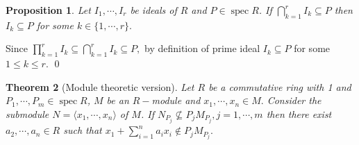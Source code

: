 \documentclass[11pt]{amsart}
\newtheorem{theorem}{Theorem}[section]
\newtheorem{prop}[theorem]{Proposition}
\newcommand{\gen}[1]{\langle#1\rangle}
\DeclareMathOperator{\spec}{\text{spec}}
\begin{document}
\begin{prop}

Let $I_1,\cdots, I_r$ be ideals of $R$ and $P\in\spec R$. If $\displaystyle\bigcap_{k=1}^r I_k\subseteq P$ then $I_k\subseteq P$ for some $k\in\{1,\cdots,r\}.$

\end{prop}

\proof Since $\displaystyle\prod_{k=1}^r I_k\subseteq \displaystyle\bigcap_{k=1}^r I_k\subseteq P,$ by definition of prime ideal $I_k\subseteq P$ for some $1\leq k\leq r.$ \qed

\begin{theorem}[Module theoretic version]

Let $R$ be a commutative ring with 1 and $P_1,\cdots, P_m\in\spec R$, $M$ be an $R-$module and $x_1,\cdots,x_n\in M.$ Consider the submodule $N=\gen{x_1,\cdots, x_n}$ of $M$. If $N_{P_j}\nsubseteq P_jM_{P_j},j=1,\cdots,m$ then there exist $a_2,\cdots,a_n\in R$ such that $x_1+\displaystyle\sum_{i=1}^n a_ix_i\notin P_jM_{P_j}.$

\end{theorem}
\end{document}
